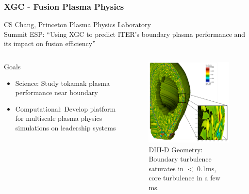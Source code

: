 \documentclass[aspectratio=169]{beamer}
\begin{document}
\begin{frame}
  \frametitle{XGC - Fusion Plasma Physics}
  CS Chang, Princeton Plasma Physics Laboratory \\
  Summit ESP: ``Using XGC to predict ITER’s boundary plasma performance and its impact on fusion efficiency''
  \begin{columns}
    \begin{column}{0.5\textwidth}
      Goals
      \begin{itemize}
        \item Science: Study tokamak plasma performance near boundary
	\item Computational: Develop platform for multiscale plasma physics simulations on leadership systems
      \end{itemize}
    \end{column}
    \begin{column}{0.5\textwidth}
      \begin{figure}
        \centering
        \includegraphics[width=.7\textwidth]{figures/xgcCase.png} \\
        \tiny{DIII-D Geometry: Boundary turbulence saturates 
        in $<$ 0.1ms, core turbulence in a few ms.}
      \end{figure}
    \end{column}
  \end{columns}
\end{frame}
\end{document}
